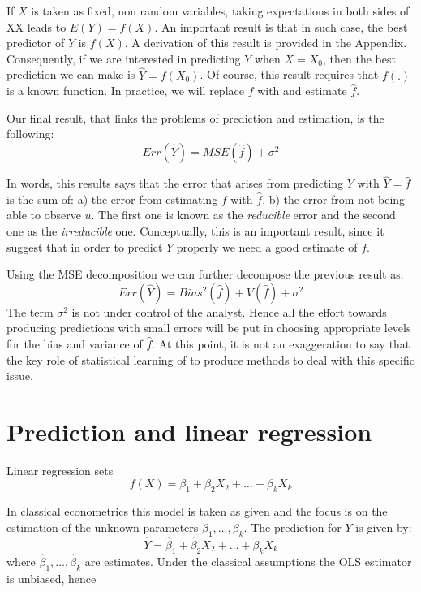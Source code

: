 If $X$ is taken as fixed, non random variables, taking expectations in both sides of XX leads to $E(Y) = f(X)$. An important result is that in such case, the best predictor of $Y$ is $f(X)$. A derivation of this result is provided in the Appendix. Consequently, if we are interested in predicting $Y$ when $X=X_0$, then the best prediction we can make is $\hat Y = f(X_0)$. Of course, this result requires that $f(.)$ is a known function. In practice, we will replace $f$ with and estimate $\hat f$. 

Our final result, that links the problems of prediction and estimation, is the following:
\[Err (\hat Y )  = MSE(\hat f) + \sigma^2\]

In words, this results says that the error that arises from predicting $Y$ with $\hat Y = \hat f$ is the sum of: a) the error from estimating $f$ with $\hat f$, b) the error from not being able to observe $u$. The first one is known as the \emph{reducible} error and the second one as the \emph{irreducible} one. Conceptually, this is an important result, since it suggest that in order to predict $Y$ properly we need a good estimate of $f$.


Using the MSE decomposition we can further decompose the previous result as:
\[Err (\hat Y ) = Bias^2(\hat f) + V(\hat f) + \sigma^2\]
The term $\sigma^2$ is not under control of the analyst. Hence all the effort towards producing predictions with small errors will be put in choosing appropriate levels for the bias and variance of $\hat f$.  At this point, it is not an exaggeration to say that the key role of statistical learning of to produce methods to deal with this specific issue. 


\section{Prediction and linear regression}
\label{sec:3_1}

Linear regression sets 
\begin{equation}\label{eq:3_1_7}
f(X)= \beta_1 +\beta_2 X_2 +\dots+\beta_k X_k
\end{equation}

In classical econometrics this model is taken as given and the focus is on the estimation of the unknown parameters $\beta_1,\dots,\beta_k$. The prediction for $Y$ is given by:
\begin{equation}\label{eq:3_1_8}
\hat{Y} = \hat{\beta}_1 + \hat{\beta}_2 X_2 + \dots + \hat{\beta}_k X_k
\end{equation}
where $\hat{\beta}_1,\dots,\hat{\beta}_k$ are estimates. Under the classical assumptions the OLS estimator is unbiased, hence 

